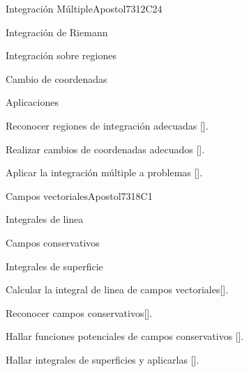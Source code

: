 \begin{syllabus}
\begin{unit}{}{Integración Múltiple}{Apostol73}{12}{C24}
   \begin{topics}
      \item Integración de Riemann
      \item Integración sobre regiones
      \item Cambio de coordenadas
      \item Aplicaciones
      \end{topics}
   \begin{learningoutcomes}
      \item Reconocer regiones de integración adecuadas [\Usage].
      \item Realizar cambios de coordenadas adecuados [\Usage].
      \item Aplicar la integración múltiple a problemas [\Usage].
      \end{learningoutcomes}
\end{unit}

\begin{unit}{}{Campos vectoriales}{Apostol73}{18}{C1}
   \begin{topics}
      \item Integrales de linea
      \item Campos conservativos
      \item Integrales de superficie
   \end{topics}
   \begin{learningoutcomes}
      \item Calcular la integral de linea de campos vectoriales[\Usage].
      \item Reconocer campos conservativos[\Usage].
      \item Hallar funciones potenciales de campos conservativos [\Usage].
      \item Hallar integrales de superficies y aplicarlas [\Usage].
      \end{learningoutcomes}
\end{unit}

\begin{coursebibliography}
\end{coursebibliography}

\end{syllabus}

%
